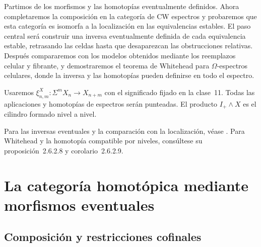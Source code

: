 
Partimos de los morfismos y las homotopías eventualmente definidos. Ahora completaremos la composición en la categoría de CW espectros y probaremos que esta categoría es isomorfa a la localización en las equivalencias estables. El paso central será construir una inversa eventualmente definida de cada equivalencia estable, retrasando las celdas hasta que desaparezcan las obstrucciones relativas. Después compararemos con los modelos obtenidos mediante los reemplazos celular y fibrante, y demostraremos el teorema de Whitehead para $\Omega$-espectros celulares, donde la inversa y las homotopías pueden definirse en todo el espectro.

Usaremos $\xi^X_{n,m}\colon\Sigma^mX_n\to X_{n+m}$ con el significado fijado en la clase~11. Todas las aplicaciones y homotopías de espectros serán punteadas. El producto $I_+\wedge X$ es el cilindro formado nivel a nivel.

Para las inversas eventuales y la comparación con la localización, véase \cite[\S3.1.3, proposición~3.1.3.8 y teorema~3.1.3.9]{malkiewich}. Para Whitehead y la homotopía compatible por niveles, consúltese su proposición~2.6.2.8 y corolario~2.6.2.9.

\section{La categoría homotópica mediante morfismos eventuales}

\subsection{Composición y restricciones cofinales}

